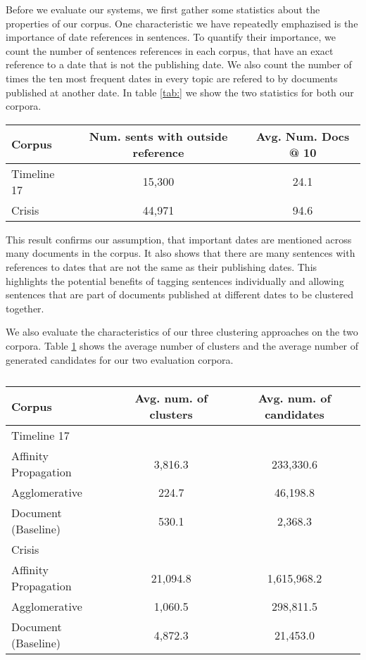 \documentclass[a4paper,BCOR=10mm]{report}
\numberwithin{lemma}{chapter}
\numberwithin{definition}{chapter}
\begin{document}
Before we evaluate our systems, we first gather some statistics about the properties of our corpus.
One characteristic we have repeatedly emphazised is the importance of date references in sentences.
To quantify their importance, we count the number of sentences references in each corpus, that have an exact reference to a date that is not the publishing date.
We also count the number of times the ten most frequent dates in every topic are refered to by documents published at another date.
In table \ref{tab:} we show the two statistics for both our corpora.

\begin{table}
\begin{tabular}{|l|cc|}
Corpus & Num. sents with outside reference & Avg. Num. Docs @ 10 \\\hline
Timeline 17 & 15,300 & 24.1 \\
Crisis & 44,971 & 94.6 \\\hline
\end{tabular}
\end{table}

This result confirms our assumption, that important dates are mentioned across many documents in the corpus. It also shows that there are many sentences with references to dates that are not the same as their publishing dates. This highlights the potential benefits of tagging sentences individually and allowing sentences that are part of documents published at different dates to be clustered together.

We also evaluate the characteristics of our three clustering approaches on the two corpora.
Table \ref{tab:genstats} shows the average number of clusters and the average number of generated candidates for our two evaluation corpora.

\begin{table}
\begin{tabular}{|l|cc|}
Corpus & Avg. num. of clusters & Avg. num. of candidates \\\hline
\multicolumn{3}{|l|}{Timeline 17}\\\hline
Affinity Propagation & 3,816.3 & 233,330.6 \\
Agglomerative  & 224.7 & 46,198.8 \\
Document (Baseline) & 530.1 & 2,368.3 \\\hline
\multicolumn{3}{|l|}{Crisis}\\\hline
Affinity Propagation & 21,094.8 & 1,615,968.2 \\
Agglomerative & 1,060.5 & 298,811.5 \\
Document (Baseline) & 4,872.3 & 21,453.0 \\\hline
\end{tabular}
\caption{}
\label{tab:genstats}
\end{table}
\end{document}
